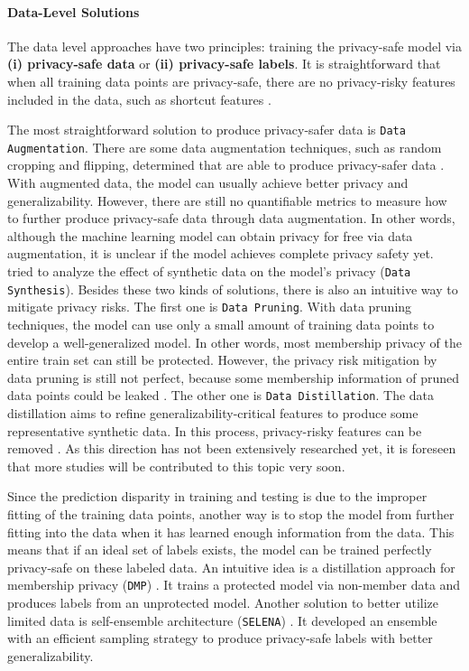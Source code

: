 \paragraph{Data-Level Solutions}
The data level approaches have two principles: training the privacy-safe model via \textbf{(i) privacy-safe data} or \textbf{(ii) privacy-safe labels}. It is straightforward that when all training data points are privacy-safe, there are no privacy-risky features included in the data, such as shortcut features \cite{geirhos2020shortcut}.


The most straightforward solution to produce privacy-safer data is \texttt{Data Augmentation}. There are some data augmentation techniques, such as random cropping and flipping, determined that are able to produce privacy-safer data \cite{kaya2021whendataaug,yu2021howdoesdataaug}. With augmented data, the model can usually achieve better privacy and generalizability. However, there are still no quantifiable metrics to measure how to further produce privacy-safe data through data augmentation. In other words, although the machine learning model can obtain privacy for free via data augmentation, it is unclear if the model achieves complete privacy safety yet.
\cite{stadler2022groundhogday} tried to analyze the effect of synthetic data on the model's privacy (\texttt{Data Synthesis}). 
Besides these two kinds of solutions, there is also an intuitive way to mitigate privacy risks. The first one is \texttt{Data Pruning}. With data pruning techniques, the model can use only a small amount of training data points to develop a well-generalized model. In other words, most membership privacy of the entire train set can still be protected. However, the privacy risk mitigation by data pruning is still not perfect, because some membership information of pruned data points could be leaked \cite{li2024datalineageinferenceuncovering}. The other one is \texttt{Data Distillation}. The data distillation aims to refine generalizability-critical features to produce some representative synthetic data. In this process, privacy-risky features can be removed \cite{dong2022privacy_dataset_condensation}. As this direction has not been extensively researched yet, it is foreseen that more studies will be contributed to this topic very soon.


Since the prediction disparity in training and testing is due to the improper fitting of the training data points, another way is to stop the model from further fitting into the data when it has learned enough information from the data. This means that if an ideal set of labels exists, the model can be trained perfectly privacy-safe on these labeled data. An intuitive idea is a distillation approach for membership privacy (\texttt{DMP}) \cite{shejwalkar2021dmp}. It trains a protected model via non-member data and produces labels from an unprotected model.
Another solution to better utilize limited data is self-ensemble architecture (\texttt{SELENA}) \cite{tang2022selena}. It developed an ensemble with an efficient sampling strategy to produce privacy-safe labels with better generalizability.

